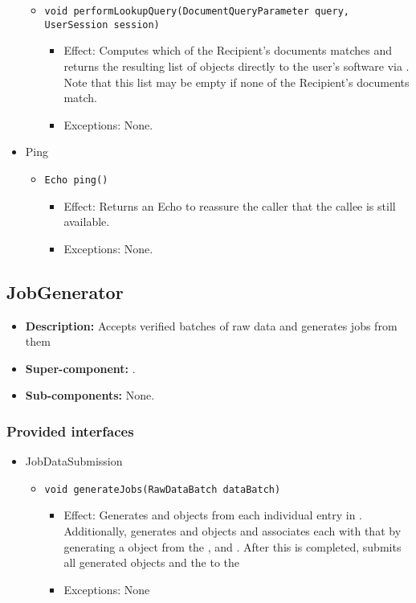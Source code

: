 \begin{itemize}
\begin{itemize}
		\item \texttt{void performLookupQuery(DocumentQueryParameter query, UserSession session)}
		\begin{itemize}
			\item Effect: Computes which of the Recipient's documents matches  and returns the resulting list of  objects directly to the user's software via . Note that this list may be empty if none of the Recipient's documents match.
			\item Exceptions: None.
		\end{itemize}
	\end{itemize}

	\item Ping
	\begin{itemize}
		\item \texttt{Echo ping()}
		\begin{itemize}
			\item Effect: Returns an Echo to reassure the caller that the callee is still available.
			\item Exceptions: None.
		\end{itemize}
	\end{itemize}

\end{itemize}

\subsection{JobGenerator}
\begin{itemize}
	\item \textbf{Description:} Accepts verified batches of raw data and generates jobs from them
	\item \textbf{Super-component:} .
	\item \textbf{Sub-components:} None.
\end{itemize}

\subsubsection*{Provided interfaces}
\begin{itemize}
	\item JobDataSubmission
	\begin{itemize}
		\item \texttt{void generateJobs(RawDataBatch dataBatch)}
		\begin{itemize}
			\item Effect: Generates  and  objects from each individual entry in . Additionally, generates  and  objects and associates each  with that  by generating a  object from the ,  and . After this is completed, submits all generated  objects and the  to the 
			\item Exceptions: None
		\end{itemize}
	\end{itemize}
\end{itemize}

